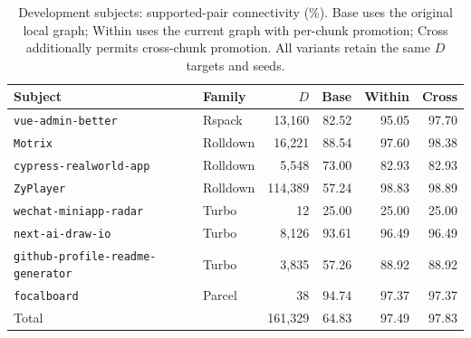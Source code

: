 \begin{table}[t]
\caption{Development subjects: supported-pair connectivity (\%). Base uses the original local graph; Within uses the current graph with per-chunk promotion; Cross additionally permits cross-chunk promotion. All variants retain the same $D$ targets and seeds.}
\label{tab:simulation-development}
\centering\small
\setlength{\tabcolsep}{4pt}
\begin{tabular}{@{}p{.34\linewidth}lrrrr@{}}
\toprule
Subject & Family & $D$ & Base & Within & Cross\\
\midrule
\nolinkurl{vue-admin-better} & Rspack & 13,160 & 82.52 & 95.05 & 97.70\\
\nolinkurl{Motrix} & Rolldown & 16,221 & 88.54 & 97.60 & 98.38\\
\nolinkurl{cypress-realworld-app} & Rolldown & 5,548 & 73.00 & 82.93 & 82.93\\
\nolinkurl{ZyPlayer} & Rolldown & 114,389 & 57.24 & 98.83 & 98.89\\
\nolinkurl{wechat-miniapp-radar} & Turbo & 12 & 25.00 & 25.00 & 25.00\\
\nolinkurl{next-ai-draw-io} & Turbo & 8,126 & 93.61 & 96.49 & 96.49\\
\nolinkurl{github-profile-readme-generator} & Turbo & 3,835 & 57.26 & 88.92 & 88.92\\
\nolinkurl{focalboard} & Parcel & 38 & 94.74 & 97.37 & 97.37\\
\midrule
Total & & 161,329 & 64.83 & 97.49 & 97.83\\
\bottomrule
\end{tabular}
\end{table}
